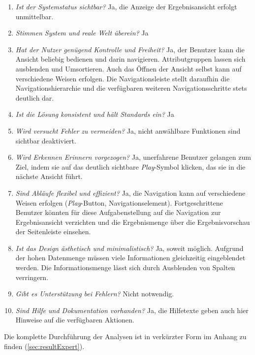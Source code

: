 \begin{enumerate}
 \item \textit{Ist der Systemstatus sichtbar?} Ja, die Anzeige der Ergebnisansicht erfolgt unmittelbar.
 \item \textit{Stimmen System und reale Welt überein?} Ja
 \item \textit{Hat der Nutzer genügend Kontrolle und Freiheit?} Ja, der Benutzer kann die Ansicht beliebig bedienen und darin navigieren. Attributgruppen lassen sich ausblenden und Umsortieren. Auch das Öffnen der Ansicht selbst kann auf verschiedene Weisen erfolgen. Die Navigationsleiste stellt daraufhin die Navigationshierarchie und die verfügbaren weiteren Navigationsschritte stets deutlich dar.
 \item \textit{Ist die Lösung konsistent und hält Standards ein?} Ja
 \item \textit{Wird versucht Fehler zu vermeiden?} Ja, nicht anwählbare Funktionen sind sichtbar deaktiviert.
 \item \textit{Wird Erkennen Erinnern vorgezogen?} Ja, unerfahrene Benutzer gelangen zum Ziel, indem sie auf das deutlich sichtbare \textit{Play}-Symbol klicken, das sie in die nächste Ansicht führt.
 \item \textit{Sind Abläufe flexibel und effizient?} Ja, die Navigation kann auf verschiedene Weisen erfolgen (\textit{Play}-Button, Navigationselement). Fortgeschrittene Benutzer könnten für diese Aufgabenstellung auf die Navigation zur Ergebnisansicht verzichten und die Ergebnismenge über die Ergebnisvorschau der Seitenleiste einsehen.
 \item \textit{Ist das Design ästhetisch und minimalistisch?} Ja, soweit möglich. Aufgrund der hohen Datenmenge müssen viele Informationen gleichzeitig eingeblendet werden. Die Informationsmenge lässt sich durch Ausblenden von Spalten verringern.
 \item \textit{Gibt es Unterstützung bei Fehlern?} Nicht notwendig.
 \item \textit{Sind Hilfe und Dokumentation vorhanden?} Ja, die Hilfetexte geben auch hier Hinweise auf die verfügbaren Aktionen.
\end{enumerate}
Die komplette Durchführung der Analysen ist in verkürzter Form im Anhang zu finden (\ref{sec:resultExpert}).\par
